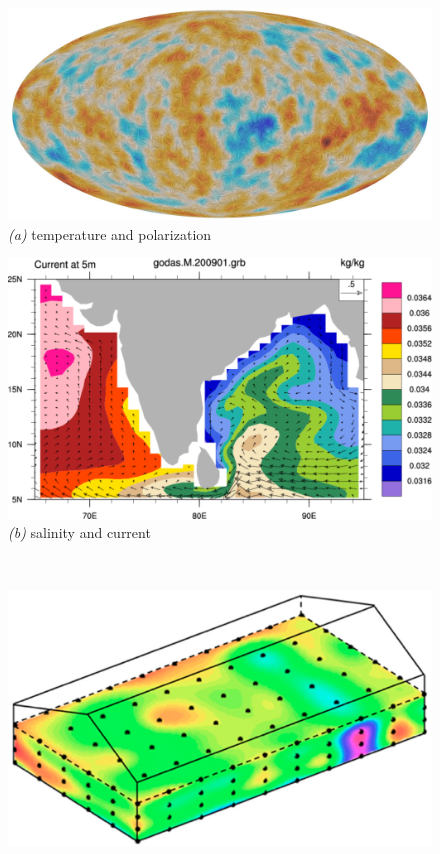 \documentclass{article}
\newenvironment{hoggfigure}{%
  \begin{figure}[tp]%
    \begin{mdframed}%
    \color{captiongray}}{%
    \end{mdframed}%
  \end{figure}}
\theoremstyle{definition}
\begin{document}
\begin{hoggfigure}
  \begin{center}
    \begin{minipage}[b]{2.5in}\noindent%
      \includegraphics[width=\textwidth]{jpegPIA18916.jpeg}\\
      \textsl{(a)} temperature and polarization
    \end{minipage}
    \begin{minipage}[b]{2in}\noindent%
      \includegraphics[width=\textwidth]{key_figures_197.pdf}\\
      \textsl{(b)} salinity and current
    \end{minipage}\\[2ex]
    \begin{minipage}[b]{2.5in}\noindent%
      \includegraphics[width=\textwidth]{applsci-09-02108-g001.png}\\

\end{minipage}
\end{center}
\end{hoggfigure}
\end{document}
